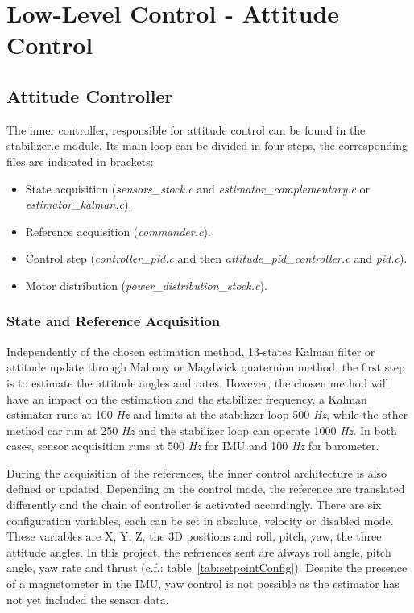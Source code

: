 \documentclass[a4paper, 12pt]{report}
\begin{document}
\newpage
\section{Low-Level Control - Attitude Control}
\subsection{Attitude Controller}
\label{sec:innerControl}
The inner controller, responsible for attitude control can be found in the stabilizer.c module. Its main loop can be divided in four steps, the corresponding files are indicated in brackets:
\begin{itemize}
\item State acquisition (\emph{sensors\_stock.c} and \emph{estimator\_complementary.c}  or \emph{estimator\_kalman.c}).
\item Reference acquisition (\emph{commander.c}).
\item Control step (\emph{controller\_pid.c} and then \emph{attitude\_pid\_controller.c} and \emph{pid.c}).
\item Motor distribution (\emph{power\_distribution\_stock.c}).
\end{itemize}

\subsubsection{State and Reference Acquisition}
Independently of the chosen estimation method, 13-states Kalman filter or attitude update through Mahony or Magdwick quaternion method, the first step is to estimate the attitude angles and rates. However, the chosen method will have an impact on the estimation and the stabilizer frequency, a Kalman estimator runs at 100 \emph{Hz} and limits at the stabilizer loop 500 \emph{Hz}, while the other method car run at 250 \emph{Hz} and the stabilizer loop can operate 1000 \emph{Hz}. In both cases, sensor acquisition runs at 500 \emph{Hz} for IMU and 100 \emph{Hz} for barometer.

During the acquisition of the references, the inner control architecture is also defined or updated. Depending on the control mode, the reference are translated differently and the chain of controller is activated accordingly. There are six configuration variables, each can be set in absolute, velocity or disabled mode.  These variables are X, Y, Z, the 3D positions and roll, pitch, yaw, the three attitude angles. In this project, the references sent are always roll angle, pitch angle, yaw rate and thrust (c.f.: table~\ref{tab:setpointConfig}). Despite the presence of a magnetometer in the IMU, yaw control is not possible as the estimator has not yet included the sensor data.
\end{document}
